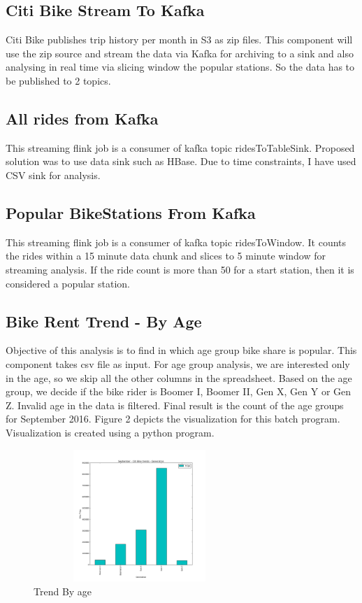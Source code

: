 \documentclass{sig-alternate-05-2015}
\begin{document}
\subsection{Citi Bike Stream To Kafka}
Citi Bike publishes trip history per month in S3 as zip files. This component will use the zip source and stream the data via Kafka for archiving to a sink and also analysing in real time via slicing window the popular stations. So the data has to be published to 2 topics. 

\subsection{All rides from Kafka}
This streaming flink job is a consumer of kafka topic ridesToTableSink. Proposed solution was to use data sink such as HBase. Due to time constraints, I have used CSV sink for analysis.

\subsection{Popular BikeStations From Kafka}
This streaming flink job is a consumer of kafka topic ridesToWindow. It counts the rides within a 15 minute data chunk and slices to 5 minute window for streaming analysis. If the ride count is more than 50 for a start station, then it is considered a popular station.

\subsection {Bike Rent Trend - By Age}
Objective of this analysis is to find in which age group bike share is popular. This component takes csv file as input. For age group analysis, we are interested only in the age, so we skip all the other columns in the spreadsheet. Based on the age group, we decide if the bike rider is Boomer I, Boomer II, Gen X, Gen Y or Gen Z. Invalid age in the data is filtered. Final result is the count of the age groups for September 2016. Figure 2 depicts the visualization for this batch program. Visualization is created using a python program.

\begin{figure}[!ht]
\includegraphics[width=8cm, height=5cm]{tripsbygeneration}
 \caption{Trend By age}\label{F:small}
\end{figure}
\end{document}
